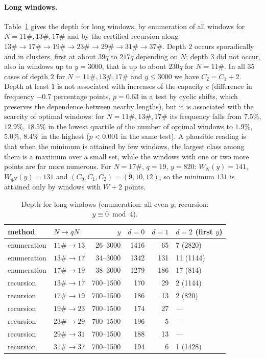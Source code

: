 \documentclass[11pt]{article}
\theoremstyle{definition}
\theoremstyle{remark}
\begin{document}
\paragraph{Long windows.} Table~\ref{tab:depth2} gives the depth for long windows, by enumeration of all windows for $N = 11\#, 13\#, 17\#$ and by the certified recursion along $13\# \to 17\# \to 19\# \to 23\# \to 29\# \to 31\# \to 37\#$. Depth $2$ occurs sporadically and in clusters, first at about $39q$ to $217q$ depending on $N$; depth $3$ did not occur, also in windows up to $y = 3000$, that is up to about $230q$ for $N = 11\#$. In all $35$ cases of depth $2$ for $N = 11\#, 13\#, 17\#$ and $y \le 3000$ we have $C_2 = C_1 + 2$. Depth at least $1$ is not associated with increases of the capacity $c$ (difference in frequency $-0.7$ percentage points, $p = 0.63$ in a test by cyclic shifts, which preserves the dependence between nearby lengths), but it is associated with the scarcity of optimal windows: for $N = 11\#, 13\#, 17\#$ its frequency falls from $7.5\%$, $12.9\%$, $18.5\%$ in the lowest quartile of the number of optimal windows to $1.9\%$, $5.0\%$, $8.4\%$ in the highest ($p < 0.001$ in the same test). A plausible reading is that when the minimum is attained by few windows, the largest class among them is a maximum over a small set, while the windows with one or two more points are far more numerous. For $N = 17\#$, $q = 19$, $y = 820$: $W_N(y) = 141$, $W_{qN}(y) = 131$ and $(C_0, C_1, C_2) = (9, 10, 12)$, so the minimum $131$ is attained only by windows with $W + 2$ points.

\begin{table}[ht]
\centering
\begin{tabular}{llrrrl}
\toprule
method & $N \to qN$ & $y$ & $d = 0$ & $d = 1$ & $d = 2$ (first $y$) \\
\midrule
enumeration & $11\# \to 13$ & 26--3000 & 1416 & 65 & 7 (2820) \\
enumeration & $13\# \to 17$ & 34--3000 & 1342 & 131 & 11 (1144) \\
enumeration & $17\# \to 19$ & 38--3000 & 1279 & 186 & 17 (814) \\
recursion & $13\# \to 17$ & 700--1500 & 170 & 29 & 2 (1144) \\
recursion & $17\# \to 19$ & 700--1500 & 186 & 13 & 2 (820) \\
recursion & $19\# \to 23$ & 700--1500 & 174 & 27 & --- \\
recursion & $23\# \to 29$ & 700--1500 & 196 & 5 & --- \\
recursion & $29\# \to 31$ & 700--1500 & 188 & 13 & --- \\
recursion & $31\# \to 37$ & 700--1500 & 194 & 6 & 1 (1428) \\
\bottomrule
\end{tabular}
\caption{Depth for long windows (enumeration: all even $y$; recursion: $y \equiv 0 \bmod 4$).}\label{tab:depth2}
\end{table}
\end{document}
